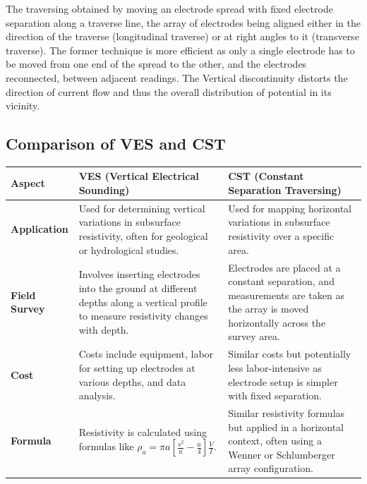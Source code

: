 \documentclass[12pt,a4paper]{report}
\begin{document}
The traversing obtained by moving an electrode spread with fixed electrode
separation along a traverse line, the array of electrodes being aligned either in
the direction of the traverse (longitudinal traverse) or at right angles to it
(transverse traverse). The former technique is more efficient as only a single
electrode has to be moved from one end of the spread to the other, and the
electrodes reconnected, between adjacent readings. The Vertical discontinuity
distorts the direction of current flow and thus the overall distribution of
potential in its vicinity.

\subsection{Comparison of VES and CST}

\begin{tabular}{|>{\raggedright\arraybackslash}m{4cm}|>{\raggedright\arraybackslash}m{6cm}|>{\raggedright\arraybackslash}m{6cm}|}
    \hline
    \textbf{Aspect} & \textbf{VES (Vertical Electrical Sounding)} & \textbf{CST (Constant Separation Traversing)} \\ \hline
    
    \textbf{Application} & Used for determining vertical variations in subsurface resistivity, often for geological or hydrological studies. & Used for mapping horizontal variations in subsurface resistivity over a specific area. \\ \hline
    
    \textbf{Field Survey} & Involves inserting electrodes into the ground at different depths along a vertical profile to measure resistivity changes with depth. & Electrodes are placed at a constant separation, and measurements are taken as the array is moved horizontally across the survey area. \\ \hline
    
    \textbf{Cost} & Costs include equipment, labor for setting up electrodes at various depths, and data analysis. & Similar costs but potentially less labor-intensive as electrode setup is simpler with fixed separation. \\ \hline
    
    \textbf{Formula} & Resistivity is calculated using formulas like $\rho_a = \pi a \left[ \frac{s^2}{a} - \frac{a}{4} \right] \frac{V}{I}$. & Similar resistivity formulas but applied in a horizontal context, often using a Wenner or Schlumberger array configuration. \\ \hline
    

\end{tabular}
\end{document}
